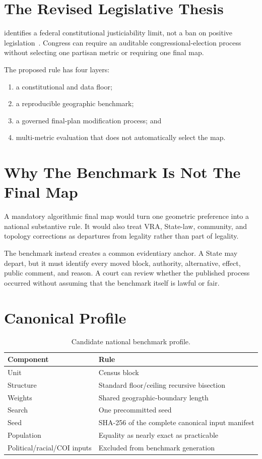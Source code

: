 \section{The Revised Legislative Thesis}

\rucho{} identifies a federal constitutional justiciability limit, not a ban on
positive legislation~\citep{rucho2019}. Congress can require an auditable
congressional-election process without selecting one partisan metric or
requiring one final map.

The proposed rule has four layers:

\begin{enumerate}
\item a constitutional and data floor;
\item a reproducible geographic benchmark;
\item a governed final-plan modification process; and
\item multi-metric evaluation that does not automatically select the map.
\end{enumerate}

\section{Why The Benchmark Is Not The Final Map}

A mandatory algorithmic final map would turn one geometric preference into a
national substantive rule. It would also treat VRA, State-law, community, and
topology corrections as departures from legality rather than part of legality.

The benchmark instead creates a common evidentiary anchor. A State may depart,
but it must identify every moved block, authority, alternative, effect, public
comment, and reason. A court can review whether the published process occurred
without assuming that the benchmark itself is lawful or fair.

\section{Canonical Profile}

\begin{table}[h]
\centering
\caption{Candidate national benchmark profile.}
\begin{tabular}{ll}
\toprule
Component & Rule \\
\midrule
Unit & Census block \\
Structure & Standard floor/ceiling recursive bisection \\
Weights & Shared geographic-boundary length \\
Search & One precommitted seed \\
Seed & SHA-256 of the complete canonical input manifest \\
Population & Equality as nearly exact as practicable \\
Political/racial/COI inputs & Excluded from benchmark generation \\
\bottomrule
\end{tabular}
\end{table}

